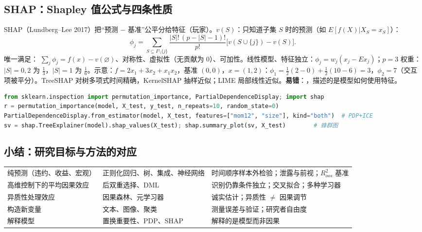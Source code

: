 \subsection{SHAP：Shapley 值公式与四条性质}
SHAP（Lundberg–Lee 2017）把“预测 $-$ 基准”公平分给特征（玩家）。$v(S)$：只知道子集 $S$ 时的预测（如 $E[f(X)|X_S=x_S]$）：
\[\phi_j=\sum_{S\subseteq F\setminus\{j\}}\frac{|S|!\,(p-|S|-1)!}{p!}\big[v(S\cup\{j\})-v(S)\big].\]
唯一满足： $\sum_j\phi_j=f(x)-v(\varnothing)$、对称性、虚拟性（无贡献为 0）、可加性。线性模型、特征独立：$\phi_j=w_j(x_j-Ex_j)$；$p=3$ 权重：$|S|=0,2$ 为 $\frac13$，$|S|=1$ 为 $\frac16$。示意：$f=2x_1+3x_2+x_1x_2$，基准 $(0,0)$，$x=(1,2)$：$\phi_1=\frac12(2-0)+\frac12(10-6)=3$，$\phi_2=7$（交互项被平分）。TreeSHAP 对树多项式时间精确，KernelSHAP 抽样近似；LIME 局部线性近似。\textbf{易错}：，描述的是模型如何使用特征。
\begin{lstlisting}[language=Python,basicstyle=\ttfamily\footnotesize]
from sklearn.inspection import permutation_importance, PartialDependenceDisplay; import shap
r = permutation_importance(model, X_test, y_test, n_repeats=10, random_state=0)
PartialDependenceDisplay.from_estimator(model, X_test, features=["mom12", "size"], kind="both")  # PDP+ICE
sv = shap.TreeExplainer(model).shap_values(X_test); shap.summary_plot(sv, X_test)        # 蜂群图
\end{lstlisting}

\subsection{小结：研究目标与方法的对应}
\begin{center}\small
\begin{tabularx}{\linewidth}{@{}p{3.6cm}p{4.4cm}L@{}}
\toprule
纯预测（违约、收益、宏观） & 正则化回归、树、集成、神经网络 & 时间顺序样本外检验；泄露与前视；$R^2_{oos}$ 基准\\
高维控制下的平均因果效应 & 后双重选择、DML & 识别仍靠条件独立；交叉拟合；多种学习器\\
异质性处理效应 & 因果森林、元学习器 & 诚实估计；异质性 $\ne$ 因果调节\\
构造新变量 & 文本、图像、聚类 & 测量误差与验证；研究者自由度\\
解释模型 & 置换重要性、PDP、SHAP & 解释的是模型而非因果\\
\bottomrule
\end{tabularx}
\end{center}

